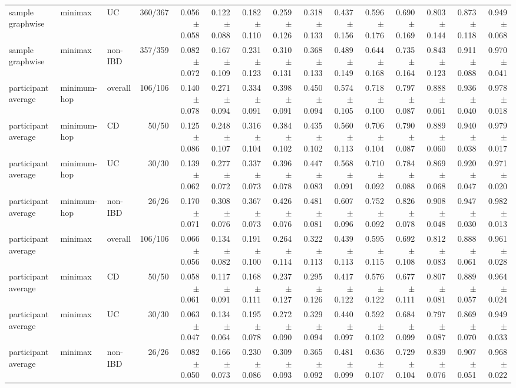 \begin{table}[ht]
{\begin{tabular}{lllrrrrrrrrrrrr}
sample graphwise & minimax & UC & 360/367 & 0.056 $\pm$ 0.058 & 0.122 $\pm$ 0.088 & 0.182 $\pm$ 0.110 & 0.259 $\pm$ 0.126 & 0.318 $\pm$ 0.133 & 0.437 $\pm$ 0.156 & 0.596 $\pm$ 0.176 & 0.690 $\pm$ 0.169 & 0.803 $\pm$ 0.144 & 0.873 $\pm$ 0.118 & 0.949 $\pm$ 0.068 \\
sample graphwise & minimax & non-IBD & 357/359 & 0.082 $\pm$ 0.072 & 0.167 $\pm$ 0.109 & 0.231 $\pm$ 0.123 & 0.310 $\pm$ 0.131 & 0.368 $\pm$ 0.133 & 0.489 $\pm$ 0.149 & 0.644 $\pm$ 0.168 & 0.735 $\pm$ 0.164 & 0.843 $\pm$ 0.123 & 0.911 $\pm$ 0.088 & 0.970 $\pm$ 0.041 \\
participant average & minimum-hop & overall & 106/106 & 0.140 $\pm$ 0.078 & 0.271 $\pm$ 0.094 & 0.334 $\pm$ 0.091 & 0.398 $\pm$ 0.091 & 0.450 $\pm$ 0.094 & 0.574 $\pm$ 0.105 & 0.718 $\pm$ 0.100 & 0.797 $\pm$ 0.087 & 0.888 $\pm$ 0.061 & 0.936 $\pm$ 0.040 & 0.978 $\pm$ 0.018 \\
participant average & minimum-hop & CD & 50/50 & 0.125 $\pm$ 0.086 & 0.248 $\pm$ 0.107 & 0.316 $\pm$ 0.104 & 0.384 $\pm$ 0.102 & 0.435 $\pm$ 0.102 & 0.560 $\pm$ 0.113 & 0.706 $\pm$ 0.104 & 0.790 $\pm$ 0.087 & 0.889 $\pm$ 0.060 & 0.940 $\pm$ 0.038 & 0.979 $\pm$ 0.017 \\
participant average & minimum-hop & UC & 30/30 & 0.139 $\pm$ 0.062 & 0.277 $\pm$ 0.072 & 0.337 $\pm$ 0.073 & 0.396 $\pm$ 0.078 & 0.447 $\pm$ 0.083 & 0.568 $\pm$ 0.091 & 0.710 $\pm$ 0.092 & 0.784 $\pm$ 0.088 & 0.869 $\pm$ 0.068 & 0.920 $\pm$ 0.047 & 0.971 $\pm$ 0.020 \\
participant average & minimum-hop & non-IBD & 26/26 & 0.170 $\pm$ 0.071 & 0.308 $\pm$ 0.076 & 0.367 $\pm$ 0.073 & 0.426 $\pm$ 0.076 & 0.481 $\pm$ 0.081 & 0.607 $\pm$ 0.096 & 0.752 $\pm$ 0.092 & 0.826 $\pm$ 0.078 & 0.908 $\pm$ 0.048 & 0.947 $\pm$ 0.030 & 0.982 $\pm$ 0.013 \\
participant average & minimax & overall & 106/106 & 0.066 $\pm$ 0.056 & 0.134 $\pm$ 0.082 & 0.191 $\pm$ 0.100 & 0.264 $\pm$ 0.114 & 0.322 $\pm$ 0.113 & 0.439 $\pm$ 0.113 & 0.595 $\pm$ 0.115 & 0.692 $\pm$ 0.108 & 0.812 $\pm$ 0.083 & 0.888 $\pm$ 0.061 & 0.961 $\pm$ 0.028 \\
participant average & minimax & CD & 50/50 & 0.058 $\pm$ 0.061 & 0.117 $\pm$ 0.091 & 0.168 $\pm$ 0.111 & 0.237 $\pm$ 0.127 & 0.295 $\pm$ 0.126 & 0.417 $\pm$ 0.122 & 0.576 $\pm$ 0.122 & 0.677 $\pm$ 0.111 & 0.807 $\pm$ 0.081 & 0.889 $\pm$ 0.057 & 0.964 $\pm$ 0.024 \\
participant average & minimax & UC & 30/30 & 0.063 $\pm$ 0.047 & 0.134 $\pm$ 0.064 & 0.195 $\pm$ 0.078 & 0.272 $\pm$ 0.090 & 0.329 $\pm$ 0.094 & 0.440 $\pm$ 0.097 & 0.592 $\pm$ 0.102 & 0.684 $\pm$ 0.099 & 0.797 $\pm$ 0.087 & 0.869 $\pm$ 0.070 & 0.949 $\pm$ 0.033 \\
participant average & minimax & non-IBD & 26/26 & 0.082 $\pm$ 0.050 & 0.166 $\pm$ 0.073 & 0.230 $\pm$ 0.086 & 0.309 $\pm$ 0.093 & 0.365 $\pm$ 0.092 & 0.481 $\pm$ 0.099 & 0.636 $\pm$ 0.107 & 0.729 $\pm$ 0.104 & 0.839 $\pm$ 0.076 & 0.907 $\pm$ 0.051 & 0.968 $\pm$ 0.022 \\
\bottomrule
\end{tabular}%
}
\end{table}
